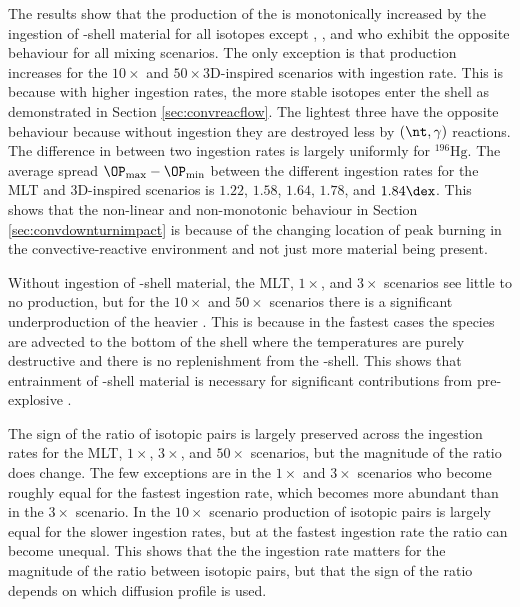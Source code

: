 The results show that the production of the \pnucn{} is monotonically increased by the ingestion of \carbon[]-shell material for all isotopes except \selenium[74], \krypton[78], and \strontium[84] who exhibit the opposite behaviour for all mixing scenarios.
The only exception is that \selenium[74] production increases for the $10\times$ and $50\times$3D-inspired scenarios with ingestion rate.
This is because with higher ingestion rates, the more stable isotopes enter the shell as demonstrated in Section \ref{sec:convreacflow}.
The lightest three have the opposite behaviour because without ingestion they are destroyed less by $(\nt,\gamma)$ reactions.
The difference in \OP{} between two ingestion rates is largely uniformly for \molybdenum[92]{--}$^{196}\mathrm{Hg}$.
The average spread $\OP_{\max} - \OP_{\min}$ between the different ingestion rates for the MLT and 3D-inspired scenarios is $1.22$, $1.58$, $1.64$, $1.78$, and $1.84 \dex$.
This shows that the non-linear and non-monotonic behaviour in Section \ref{sec:convdownturnimpact} is because of the changing location of peak burning in the convective-reactive environment and not just more material being present.

Without ingestion of \carbon[]-shell material, the MLT, $1\times$, and $3\times$ scenarios see little to no production, but for the $10\times$ and $50\times$ scenarios there is a significant underproduction of the heavier \pnucn{}. 
This is because in the fastest cases the species are advected to the bottom of the shell where the temperatures are purely destructive and there is no replenishment from the \carbon[]-shell.
This shows that entrainment of \carbon[]-shell material is necessary for significant contributions from pre-explosive \gprn.

The sign of the ratio of isotopic pairs is largely preserved across the ingestion rates for the MLT, $1\times$, $3\times$, and $50\times$ scenarios, but the magnitude of the ratio does change.
The few exceptions are \erbium[162,164] in the $1\times$ and $3\times$ scenarios who become roughly equal for the fastest ingestion rate, \tin[115] which becomes more abundant than \tin[112,114] in the $3\times$ scenario.
In the $10\times$ scenario production of isotopic pairs is largely equal for the slower ingestion rates, but at the fastest ingestion rate the ratio can become unequal.
This shows that the the ingestion rate matters for the magnitude of the ratio between isotopic pairs, but that the sign of the ratio depends on which diffusion profile is used.

